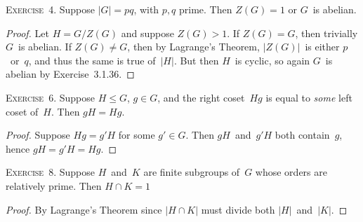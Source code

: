 \documentclass[letterpaper]{article}
\newcommand{\exercise}[1]{\goodbreak\noindent\textsc{Exercise~{#1}.}}
\newcommand{\sect}{\cap}
\newcommand{\subgroup}{\le}
\newcommand{\ord}[1]{|{#1}|}
\begin{document}
\exercise{4} Suppose $\ord{G}=pq$, with $p,q$ prime. Then $Z(G)=1$ or $G$~is abelian.
\begin{proof}
Let $H=G/Z(G)$ and suppose $Z(G)>1$. If $Z(G)=G$, then trivially $G$~is abelian. If $Z(G)\ne G$, then by Lagrange's Theorem, $\ord{Z(G)}$~is either $p$~or~$q$, and thus the same is true of~$\ord{H}$. But then $H$~is cyclic, so again $G$~is abelian by Exercise~3.1.36.
\end{proof}

\exercise{6} Suppose $H\subgroup G$, $g\in G$, and the right coset~$Hg$ is equal to \emph{some} left coset of~$H$. Then $gH=Hg$.
\begin{proof}
Suppose $Hg=g'H$ for some $g'\in G$. Then $gH$~and~$g'H$ both contain~$g$, hence $gH=g'H=Hg$.
\end{proof}

\exercise{8}
Suppose $H$~and~$K$ are finite subgroups of~$G$ whose orders are relatively prime. Then $H\sect K=1$
\begin{proof}
By Lagrange's Theorem since $\ord{H\sect K}$ must divide both $\ord{H}$~and~$\ord{K}$.
\end{proof}
\end{document}
